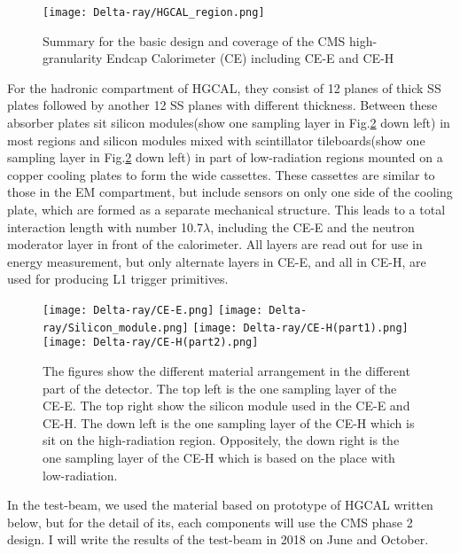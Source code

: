 \documentclass[12pt,twoside,a4paper,an,final]{cms-tdr}
\begin{document}
\begin{figure}[!htb]
\centering 
     \texttt{[image: Delta-ray/HGCAL\_region.png]}
\caption{Summary for the basic design and coverage of the CMS high-granularity Endcap Calorimeter (CE) including CE-E and CE-H}
\label{HGCAL_region}
\end{figure}

For the hadronic compartment of HGCAL, they consist of 12 planes of thick SS plates followed by another 12 SS planes with different thickness. Between these absorber plates sit silicon modules(show one sampling layer in Fig.\ref{HGCAL_Material} down left) in most regions and silicon modules mixed with scintillator tileboards(show one sampling layer in Fig.\ref{HGCAL_Material} down left) in part of low-radiation regions mounted on a copper cooling plates to form the wide cassettes.  These cassettes are similar to those in the EM compartment, but include sensors on only one side of the cooling plate, which are formed as a separate mechanical structure. This leads to a total interaction length with number 10.7$\lambda$, including the CE-E and the neutron moderator layer in front of the calorimeter. All layers are read out for use in energy measurement, but only alternate layers in CE-E, and all in CE-H, are used for producing L1 trigger primitives. 

\begin{figure}[!htb]
\centering  
     \texttt{[image: Delta-ray/CE-E.png]}
     \texttt{[image: Delta-ray/Silicon\_module.png]}
     \texttt{[image: Delta-ray/CE-H(part1).png]}
     \texttt{[image: Delta-ray/CE-H(part2).png]}
\caption{The figures show the different material arrangement in the different part of the detector. The top left is the one sampling layer of the CE-E. The top right show the silicon module used in the CE-E and CE-H. The down left is the one sampling layer of the CE-H which is sit on the high-radiation region. Oppositely, the down right is the one sampling layer of the CE-H which is based on the place with low-radiation.}
\label{HGCAL_Material}
\end{figure}

In the test-beam, we used the material based on prototype of HGCAL written below,  but for the detail of its, each components will use the CMS phase 2 design. I will write the results of the test-beam in 2018 on June and October.  
\end{document}
